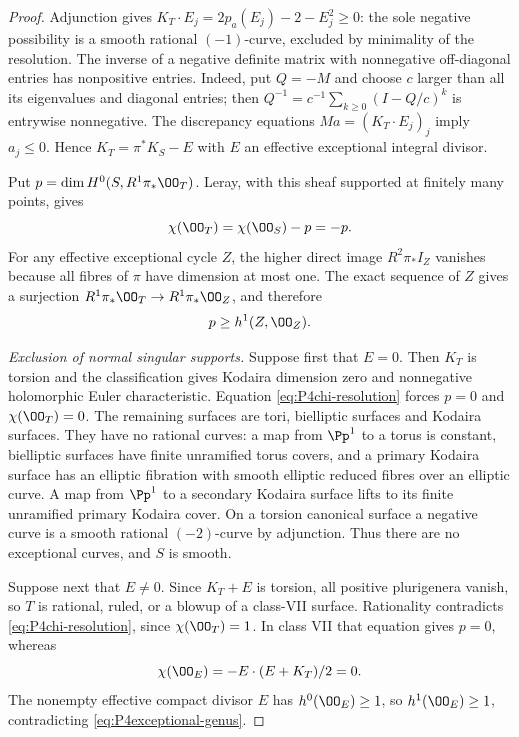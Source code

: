 \begin{proof}
Adjunction gives
$K_T\cdot E_j=2p_a(E_j)-2-E_j^2\ge0$: the sole negative
possibility is a smooth rational $(-1)$-curve, excluded by
minimality of the resolution. The inverse of a negative definite
matrix with nonnegative off-diagonal entries has nonpositive
entries. Indeed, put $Q=-M$ and choose $c$ larger than all its
eigenvalues and diagonal entries; then
$Q^{-1}=c^{-1}\sum_{k\ge0}(I-Q/c)^k$ is entrywise nonnegative.
The discrepancy equations $Ma=(K_T\cdot E_j)_j$ imply
$a_j\le0$. Hence $K_T=\pi^*K_S-E$ with $E$ an effective
exceptional integral divisor.

Put $p=\dim H^0(S,R^1\pi_*\OO_T)$. Leray, with this sheaf
supported at finitely many points, gives
\begin{equation}\label{eq:P4chi-resolution}
 \chi(\OO_T)=\chi(\OO_S)-p=-p.
\end{equation}
For any effective exceptional cycle $Z$, the higher direct image
$R^2\pi_*I_Z$ vanishes because all fibres of $\pi$ have dimension
at most one. The exact sequence of $Z$ gives a surjection
$R^1\pi_*\OO_T\to R^1\pi_*\OO_Z$, and therefore
\begin{equation}\label{eq:P4exceptional-genus}
 p\ge h^1(Z,\OO_Z).
\end{equation}

\emph{Exclusion of normal singular supports.}
Suppose first that $E=0$. Then $K_T$ is torsion and the
classification gives Kodaira dimension zero and nonnegative
holomorphic Euler characteristic. Equation
\eqref{eq:P4chi-resolution} forces $p=0$ and $\chi(\OO_T)=0$.
The remaining surfaces are tori, bielliptic surfaces and Kodaira
surfaces. They have no rational curves: a map from $\Pp^1$ to
a torus is constant, bielliptic surfaces have finite unramified
torus covers, and a primary Kodaira surface has an elliptic
fibration with smooth elliptic reduced fibres over an elliptic
curve. A map from $\Pp^1$ to a secondary Kodaira surface lifts
to its finite unramified primary Kodaira cover. On a torsion
canonical surface a negative curve is a smooth rational
$(-2)$-curve by adjunction. Thus there are no exceptional
curves, and $S$ is smooth.

Suppose next that $E\ne0$. Since $K_T+E$ is torsion, all
positive plurigenera vanish, so $T$ is rational, ruled, or a
blowup of a class-VII surface. Rationality contradicts
\eqref{eq:P4chi-resolution}, since $\chi(\OO_T)=1$. In class
VII that equation gives $p=0$, whereas
\[
 \chi(\OO_E)=-E\cdot(E+K_T)/2=0.
\]
The nonempty effective compact divisor $E$ has $h^0(\OO_E)\ge1$,
so $h^1(\OO_E)\ge1$, contradicting
\eqref{eq:P4exceptional-genus}.


\end{proof}
